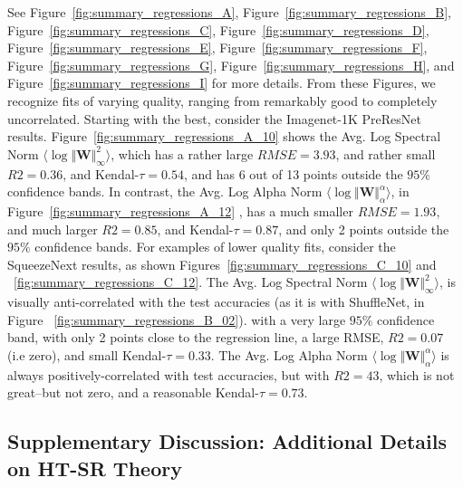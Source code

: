 See
Figure~\ref{fig:summary_regressions_A},
Figure~\ref{fig:summary_regressions_B},
Figure~\ref{fig:summary_regressions_C},
Figure~\ref{fig:summary_regressions_D},
Figure~\ref{fig:summary_regressions_E},
Figure~\ref{fig:summary_regressions_F},
Figure~\ref{fig:summary_regressions_G},
Figure~\ref{fig:summary_regressions_H}, and
Figure~\ref{fig:summary_regressions_I} for more details.
From these Figures, we recognize fits of varying quality, ranging from remarkably good to completely uncorrelated.
Starting with the best, consider the Imagenet-1K PreResNet results.  Figure~\ref{fig:summary_regressions_A_10} shows 
the Avg. Log Spectral Norm $\langle\log\Vert\mathbf{W}\Vert^{2}_{\infty}\rangle$, 
which has a rather large $RMSE=3.93$, and rather small $R2=0.36$, and Kendal-$\tau=0.54$, and
has 6 out of 13 points outside the $95\%$ confidence bands.  In contrast, 
the Avg. Log Alpha Norm $\langle\log\Vert\mathbf{W}\Vert^{\alpha}_{\alpha}\rangle$, 
in  Figure~\ref{fig:summary_regressions_A_12} , 
has a much smaller $RMSE=1.93$, and much larger  $R2=0.85$, and Kendal-$\tau=0.87$, 
and only 2 points outside the $95\%$ confidence bands.
For examples of lower quality fits, consider the SqueezeNext results, as shown Figures~\ref{fig:summary_regressions_C_10} and 
~\ref{fig:summary_regressions_C_12}.  
The Avg. Log Spectral Norm $\langle\log\Vert\mathbf{W}\Vert^{2}_{\infty}\rangle$,
is visually anti-correlated  with the test accuracies
(as it is with ShuffleNet, in Figure ~\ref{fig:summary_regressions_B_02}).
with a very large $95\%$ confidence band, with only 2 points close to the regression line,
a large RMSE,  $R2=0.07$ (i.e zero), and small Kendal-$\tau=0.33$.
The Avg. Log Alpha Norm $\langle\log\Vert\mathbf{W}\Vert^{\alpha}_{\alpha}\rangle$ is always positively-correlated
with test accuracies, but with $R2=43$, which is not great--but not zero, and a reasonable Kendal-$\tau=0.73$.














\subsection{Supplementary Discussion: Additional Details on HT-SR Theory}

